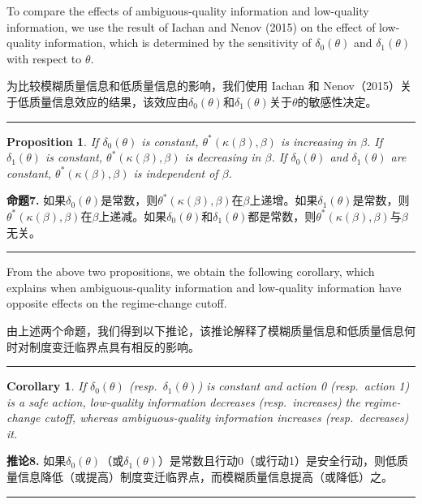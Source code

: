 \documentclass[12pt,a4paper]{article}
\newenvironment{original}
  {\par\medskip\noindent\color{black}\ignorespaces}
  {\par\medskip}
\newenvironment{translation}
  {\par\noindent\color{darkblue}\ignorespaces}
  {\par\medskip\noindent\hrule\par\medskip}
\newtheorem{proposition}[theorem]{Proposition}
\newtheorem{corollary}[theorem]{Corollary}
\theoremstyle{definition}
\theoremstyle{remark}
\begin{document}
\begin{original}
To compare the effects of ambiguous-quality information and low-quality information, we use the result of Iachan and Nenov (2015) on the effect of low-quality information, which is determined by the sensitivity of $\delta_0(\theta)$ and $\delta_1(\theta)$ with respect to $\theta$.
\end{original}
\begin{translation}
为比较模糊质量信息和低质量信息的影响，我们使用 Iachan 和 Nenov（2015）关于低质量信息效应的结果，该效应由$\delta_0(\theta)$和$\delta_1(\theta)$关于$\theta$的敏感性决定。
\end{translation}

\begin{proposition}
If $\delta_0(\theta)$ is constant, $\theta^*(\kappa(\beta), \beta)$ is increasing in $\beta$. If $\delta_1(\theta)$ is constant, $\theta^*(\kappa(\beta), \beta)$ is decreasing in $\beta$. If $\delta_0(\theta)$ and $\delta_1(\theta)$ are constant, $\theta^*(\kappa(\beta), \beta)$ is independent of $\beta$.
\end{proposition}
\begin{translation}
\color{darkblue}\textbf{命题7.} 如果$\delta_0(\theta)$是常数，则$\theta^*(\kappa(\beta), \beta)$在$\beta$上递增。如果$\delta_1(\theta)$是常数，则$\theta^*(\kappa(\beta), \beta)$在$\beta$上递减。如果$\delta_0(\theta)$和$\delta_1(\theta)$都是常数，则$\theta^*(\kappa(\beta), \beta)$与$\beta$无关。
\end{translation}

\begin{original}
From the above two propositions, we obtain the following corollary, which explains when ambiguous-quality information and low-quality information have opposite effects on the regime-change cutoff.
\end{original}
\begin{translation}
由上述两个命题，我们得到以下推论，该推论解释了模糊质量信息和低质量信息何时对制度变迁临界点具有相反的影响。
\end{translation}

\begin{corollary}
If $\delta_0(\theta)$ (resp.\ $\delta_1(\theta)$) is constant and action 0 (resp.\ action 1) is a safe action, low-quality information decreases (resp.\ increases) the regime-change cutoff, whereas ambiguous-quality information increases (resp.\ decreases) it.
\end{corollary}
\begin{translation}
\color{darkblue}\textbf{推论8.} 如果$\delta_0(\theta)$（或$\delta_1(\theta)$）是常数且行动0（或行动1）是安全行动，则低质量信息降低（或提高）制度变迁临界点，而模糊质量信息提高（或降低）之。
\end{translation}
\end{document}
